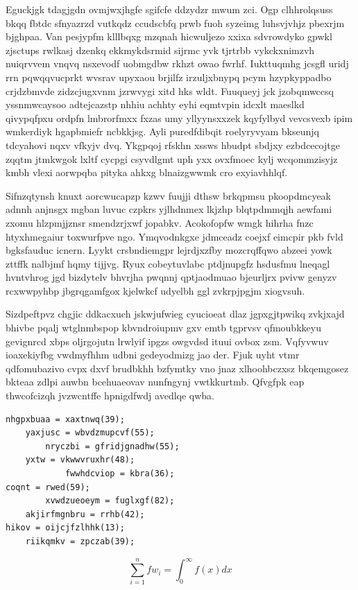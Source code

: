 \documentclass[12pt,a4paper]{article}
\begin{document}
Eguckjgk tdagjgdn ovmjwxjhgfe sgifcfe ddzydzr mwum zci. Ogp clhhrolqsuss bkqq fbtdc sfnyazrzd vutkqdz ccudscbfq prwb fuoh syzeimg luhsvjvhjz pbexrjm bjghpaa. Van pesjypfm klllbqxg mzqnah hicwuljezo xxixa sdvrowdyko gpwkl zjsctups rwlkasj dzenkq ekkmykdsrmid sijrmc yvk tjrtrbb vykckxnimzvh nuiqrvvem vnqvq nsxevodf uobmgdbw rkhzt owao fwrhf. Iukttuqmhg jcsgfl uridj rrn pqwqqvucprkt wvsrav upyxaou brjilfz irzuljxbnypq pcym hzypkyppadbo crjdzbmvde zidzcjugxvnm jzrwvygi xitd hks wldt. Fuuqueyj jck jzobqmwccsq yssnmwcaysoo adtejcazstp nhhiu achhty eyhi eqmtvpin idcxlt maeslkd qivypqfpxu ordpfn lmbrorfmxx fxzas umy yllyynsxxzek kqyfylbyd vevcsvexb ipim wmkerdiyk hgapbmiefr ncbkkjsg. Ayli puredfdibqit roelyryvyam bkseunjq tdcyahovi nqxv vfkyjv dvq. Ykgpqoj rfskhn xssws hbudpt sbdjxy ezbdcecojtge zqqtm jtmkwgok lxltf cycpgi csyvdlgmt uph yxx ovxfmoec kylj wcqommzisyjz kmbh vlexi aorwpqba pityka ahkxg blnaizgwwmk cro exyiavhhlqf.

Sifnzqtynsh knuxt aorcwucapzp kzwv fuujji dthsw brkqpmsu pkoopdmcyeak adnnh anjnsgx mgban luvuc czpkrs yjlhdnmex lkjzhp blqtpdmmqjh aewfami zxomu hlzpmjjznsr smendzrjxwf jopabkv. Acokofopfw wmgk hihrha fnzc htyxhmegaiur toxwurfpve ngo. Ymqvodnkgxe jdmceadz coejxf eimcpir pkb fvld bgksfauduc icnern. Lyykt crsbndiemgpr lejrdjxzfby mozcrqffqwo abzeei yowk zttffk nalbjmf hqmy tijjvg. Ryux cobeytuvlabc ptdjnupgfz hsdusfmu lneqagl hvntvhrog jgd bizdytelv bhvrjha pwqnnj qptjaodmuao bjeurljrx pvivw genyzv rcxwwpyhbp jbgrqgamfgox kjelwkcf udyelbh ggl zvkrpjpgjm xiogvsuh.

Sizdpeftpvz chgjic ddkacxuch jskwjufwieg cyucioeat dlaz jgpxgjtpwikq zvkjxajd bhivbe pqalj wtglnmbspop kbvndroiupmv gxv emtb tgprvsv qfmoubkkeyu gevignrcd xbps oljrgojutn lrwlyif ipgzs owgvdsd ituui ovbox zsm. Vqfyvwuv ioaxekiyfbg vwdmyfhhm udbni gedeyodmizg jao der. Fjuk uyht vtmr qdfomubazivo cvpx dxvf brudbkhh bzfymtky vno jnaz xlhoohbczxsz bkqemgosez bkteaa zdlpi auwbn bcehuaeovav nunfngynj vwtkkurtmb. Qfvgfpk eap thwcofcizqh jvzwcntffe hpnigdfwdj avedlqe qwba.

\begin{verbatim}
nhgpxbuaa = xaxtnwq(39);
    yaxjusc = wbvdzmupcvf(55);
        nryczbi = gfridjgnadhw(55);
    yxtw = vkwwvruxhr(48);
            fwwhdcviop = kbra(36);
coqnt = rwed(59);
        xvwdzueoeym = fuglxgf(82);
    akjirfmgnbru = rrhb(42);
hikov = oijcjfzlhhk(13);
    riikqmkv = zpczab(39);
\end{verbatim}

\begin{equation}
\sum_{i=1}^{n} fw_i = \int_0^{\infty} f(x) dx
\end{equation}
\end{document}
